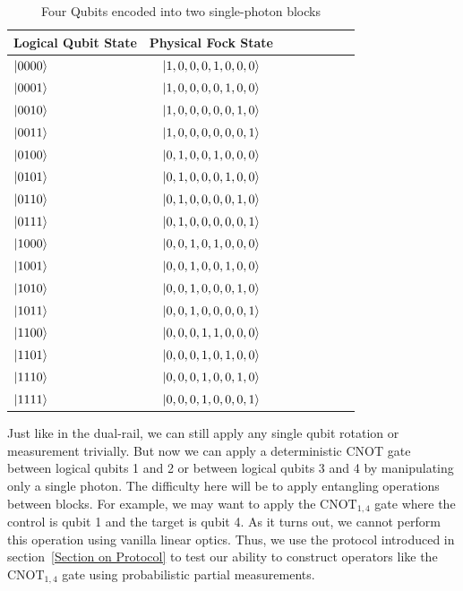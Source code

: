 \documentclass[aps,pra,twocolumn,showpacs,superscriptaddress,floatfix,10pt]{revtex4}
\begin{document}
\begin {table}[h]
\begin{center}
	\begin{tabular}{l*{6}{c}r} 
		Logical Qubit State      \quad \quad \quad     & Physical Fock State \\
		\hline 
		\quad \quad \quad $\ket{0000}$     & $\ket{1,0,0,0,1,0,0,0}$ \\
		\quad \quad \quad $\ket{0001}$            & $\ket{1,0,0,0,0,1,0,0}$ \\
		\quad \quad \quad $\ket{0010}$           & 
		$\ket{1,0,0,0,0,0,1,0}$ \\
		\quad \quad \quad $\ket{0011}$           & 
		$\ket{1,0,0,0,0,0,0,1}$ \\
		\quad \quad \quad $\ket{0100}$           & 
		$\ket{0,1,0,0,1,0,0,0}$ \\
		\quad \quad \quad $\ket{0101}$           & 
		$\ket{0,1,0,0,0,1,0,0}$ \\
		\quad \quad \quad $\ket{0110}$           & 
		$\ket{0,1,0,0,0,0,1,0}$ \\
		\quad \quad \quad $\ket{0111}$            & $\ket{0,1,0,0,0,0,0,1}$ \\
		\quad \quad \quad $\ket{1000}$            & $\ket{0,0,1,0,1,0,0,0}$ \\
		\quad \quad \quad $\ket{1001}$            & $\ket{0,0,1,0,0,1,0,0}$ \\
		\quad \quad \quad $\ket{1010}$            & $\ket{0,0,1,0,0,0,1,0}$ \\
		\quad \quad \quad $\ket{1011}$            & $\ket{0,0,1,0,0,0,0,1}$ \\
		\quad \quad \quad $\ket{1100}$            & $\ket{0,0,0,1,1,0,0,0}$ \\
		\quad \quad \quad $\ket{1101}$            & $\ket{0,0,0,1,0,1,0,0}$ \\
		\quad \quad \quad $\ket{1110}$            & $\ket{0,0,0,1,0,0,1,0}$ \\
		\quad \quad \quad $\ket{1111}$            & $\ket{0,0,0,1,0,0,0,1}$ \\
	\end{tabular}
	\caption{ \label{Block Encoding Table} Four Qubits encoded into two single-photon blocks}
\end{center}
\end{table}
Just like in the dual-rail, we can still apply any single qubit rotation or measurement trivially. But now we can apply a deterministic CNOT gate between logical qubits 1 and 2 or between logical qubits 3 and 4 by manipulating only a single photon. The difficulty here will be to apply entangling operations between blocks. For example, we may want to apply the $\mbox{CNOT}_{1,4}$ gate where the control is qubit 1 and the target is qubit 4. As it turns out, we cannot perform this operation using vanilla linear optics. Thus, we use the protocol introduced in section~\ref{Section on Protocol} to test our ability to construct operators like the $\mbox{CNOT}_{1,4}$ gate using probabilistic partial measurements.
\end{document}
